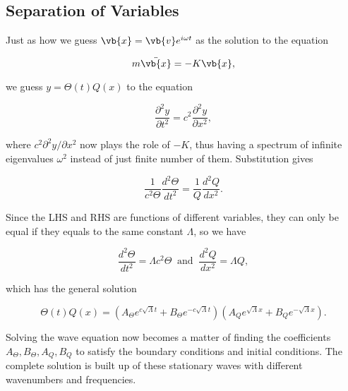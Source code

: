 \documentclass[a4paper,12pt]{report}
\begin{document}
\subsection{Separation of Variables} \label{sepvar} 

Just as how we guess \(\vb{x} = \vb{v} e^{i \omega t} \) as the solution to the equation

\begin{equation}
	m\ddot{\vb{x} } = -K\vb{x} ,  
\end{equation}

we guess \(y = \Theta (t)Q(x)\) to the equation 

\begin{equation}
	\frac{\partial^2 y}{\partial t^2} = c^2 \frac{\partial^2 y}{\partial x^2}, 
\end{equation}

where \(c^2 \partial ^2 y/\partial x^2 \) now plays the role of \(-K\), thus having a spectrum of infinite eigenvalues \(\omega ^2\) instead of just finite number of them. Substitution gives

\begin{equation}
	\frac{1}{c^2 \Theta } \frac{d^2\Theta }{dt^2} = \frac{1}{Q}\frac{d^2Q}{dx^2}.
\end{equation}

Since the LHS and RHS are functions of different variables, they can only be equal if they equals to the same constant \(\Lambda \), so we have

\begin{equation}
	\frac{d^2\Theta }{dt^2} = \Lambda c^2 \Theta ~\text { and }~ \frac{d^2Q}{dx^2} = \Lambda Q,
\end{equation}

which has the general solution

\begin{equation}
	\Theta (t) Q(x) = \left(A_{\Theta } e^{c\sqrt{\Lambda } t} + B_{\Theta }e^{-c\sqrt{\Lambda } t} \right) \left(A_{Q} e^{\sqrt{\Lambda } x} + B_{Q}e^{-\sqrt{\Lambda } x} \right). \label{ThetaQ}   
\end{equation}

Solving the wave equation now becomes a matter of finding the coefficients \(A_{\Theta }, B_{\Theta }, A_{Q}, B_{Q}  \) to satisfy the boundary conditions and initial conditions. The complete solution is built up of these stationary waves with different wavenumbers and frequencies.
\end{document}
